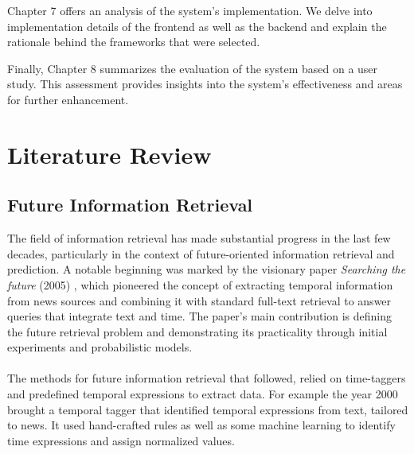 \documentclass[a4paper,10pt]{report}
\begin{document}
Chapter 7 offers an analysis of the system's implementation. We delve into implementation details of the frontend as well as the backend and explain the rationale behind the frameworks that were selected.

Finally, Chapter 8 summarizes the evaluation of the system based on a user study. This assessment provides insights into the system's effectiveness and areas for further enhancement.



\chapter{Literature Review}

\section{Future Information Retrieval}
The field of information retrieval has made substantial progress in the last few decades, particularly in the context of future-oriented information retrieval and prediction. A notable beginning was marked by the visionary paper \textit{Searching the future} (2005) \cite{BaezaYatesSearchingTF}, which pioneered the concept of extracting temporal information from news sources and combining it with standard full-text retrieval to answer queries that integrate text and time. The paper's main contribution is defining the future retrieval problem and demonstrating its practicality through initial experiments and probabilistic models. 
\\\\
The methods for future information retrieval that followed, relied on time-taggers and predefined temporal expressions to extract data.
For example the year 2000 brought a temporal tagger \cite{ManiRobustTP} that identified temporal expressions from text, tailored to news. It used hand-crafted rules as well as some machine learning to identify time expressions and assign normalized values.
\end{document}
